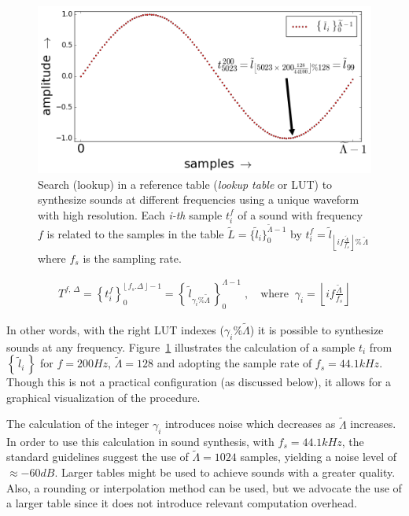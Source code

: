 \begin{figure}[t!]
    \centering
        \includegraphics[width=.7\textwidth]{figures/lut_}
	\caption{Search (lookup) in a reference table (\emph{lookup table} or LUT) to synthesize sounds at different frequencies using a unique waveform with high resolution.
	Each \emph{i-th} sample $t_i^f$ of a sound with frequency $f$ is related to the samples in the table $\widetilde{L}=\{\widetilde{l}_i\}_0^{\widetilde{\Lambda}-1}$ by $t_i^{f}=\widetilde{l}_{\left\lfloor i f\frac{\widetilde{\Lambda}}{f_s} \right\rfloor \%\,\widetilde{\Lambda}}$ where $f_s$ is the sampling rate.}
        \label{fig:lut}
\end{figure}

\begin{equation}\label{eq:lut}
\begin{split}
T^{f,\,\Delta}=\left\{t_i^f\right\}_0^{\lfloor \, f_s . \Delta \, \rfloor -1} = \left\{ \, \widetilde{l}_{\gamma_i \% \widetilde{\Lambda} }\, \right\}_{0}^{\Lambda-1}\; , \quad \text{where} \;\; \gamma_i = \left \lfloor i f \frac{ \widetilde{\Lambda}}{f_s} \right \rfloor  
\end{split}
\end{equation}

In other words, with the right LUT indexes ($\gamma_i\%\widetilde{\Lambda}$) it is possible to synthesize sounds at any frequency.
Figure~\ref{fig:lut} illustrates the calculation of a sample $t_i$ from $\left\{\,\widetilde{l}_i\,\right\}$ for $f=200Hz$, $\widetilde{\Lambda}=128$ and adopting the sample rate of $f_s=44.1kHz$. Though this is not a practical configuration (as discussed below), it allows for a graphical visualization of the procedure.

The calculation of the integer $\gamma_i$ introduces noise which decreases as $\widetilde{\Lambda}$ increases.
In order to use this calculation in sound synthesis,
with $f_s=44.1 kHz$, the standard guidelines suggest the use of $\widetilde{\Lambda} = 1024$ samples,
yielding a noise level of $\approx -60dB$.
Larger tables might be used to achieve sounds with a greater quality.
Also, a rounding or interpolation method can be used,
but we advocate the use of a larger table since it does not
introduce relevant computation overhead.~\cite{Geiger}


